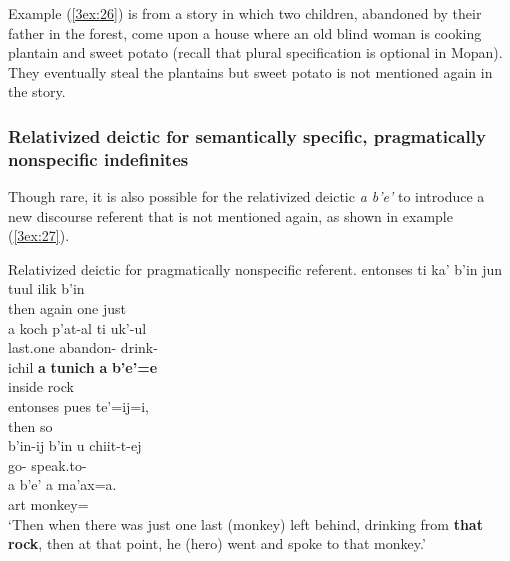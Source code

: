 \documentclass[output=paper]{langsci/langscibook}
\begin{document}
{
Example (\ref{3ex:26}) is from a story in which two children, abandoned by their father in the forest, come upon a house where an old blind woman is cooking plantain and sweet potato (recall that plural specification is optional in Mopan).  They eventually steal the plantains but sweet potato is not mentioned again in the story.
}

\subsubsection{Relativized deictic for semantically specific, pragmatically nonspecific indefinites}\label{3sec:342}

Though rare, it is also possible for the relativized deictic {\emph{a b'e'}} to introduce a new discourse referent that is not mentioned again, as shown in example (\ref{3ex:27}).

\begin{exe}
\ex\label{3ex:27}
Relativized deictic for pragmatically nonspecific referent. 
\exi{}
\gll 	entonses 	ti 			ka'		b'in 		jun 	tuul 			ilik 	b'in  \\
	then 		{} 	again	{} 	one 	{} 	just	{} \\
\glt 
\exi{}
\gll	a 	koch		p'at-al				ti			uk'-ul \\		 
	{}	last.one	abandon-{}	{}		drink-{} \\
\glt 
\exi{}
\gll	ichil		{\bf{a}}	{\bf{tunich}}	{\bf{a}}	{\bf{b'e'=e}} \\
	inside	{}	rock			{}	{} \\
\glt 
\exi{}
\gll	entonses	pues		te'=ij=i,  \\
	then		so		{} \\
\glt 
\exi{}
\gll	b'in-ij				b'in			u		chiit-t-ej \\
	go-{}	{}		{}	speak.to-{} \\
\glt 
\exi{}
\gll	a 	b'e'			a 	ma'ax=a. \\
	{} 	{}	art	monkey={} \\
\glt	`Then when there was just one last (monkey) left behind, drinking from {\bf{that rock}}, then at that point, he (hero) went and spoke to that monkey.'
\end{exe}
\end{document}

